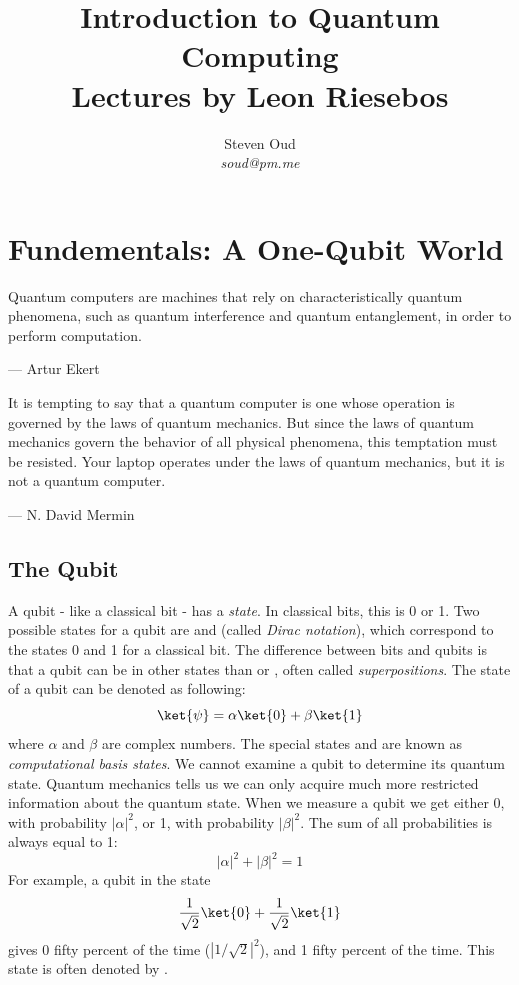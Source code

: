 \documentclass[11pt]{article}
\title{\textbf{Introduction to Quantum Computing \\
\large Lectures by Leon Riesebos}}
\author{Steven Oud \\ \emph{soud@pm.me}}
\begin{document}
\vfill
\maketitle

\tableofcontents

\newpage

\section{Fundementals: A One-Qubit World}
\epigraph{Quantum computers are machines that rely on characteristically quantum phenomena, such as quantum interference and quantum entanglement, in order to perform computation.}{--- Artur Ekert}

\epigraph{It is tempting to say that a quantum computer is one whose operation is governed by the laws of quantum mechanics. But since the laws of quantum mechanics govern the behavior of all physical phenomena, this temptation must be resisted. Your laptop operates under the laws of quantum mechanics, but it is not a quantum computer.}{--- N. David Mermin}

\subsection{The Qubit}
A qubit - like a classical bit - has a \emph{state}. In classical bits, this is 0 or 1. Two possible states for a qubit are  and  (called \emph{Dirac notation}), which correspond to the states 0 and 1 for a classical bit. The difference between bits and qubits is that a qubit can be in other states than  or , often called \emph{superpositions}. The state of a qubit can be denoted as following:
\[\ket{\psi} = \alpha\ket{0} + \beta\ket{1}\]
where $\alpha$ and $\beta$ are complex numbers. The special states  and  are known as \emph{computational basis states}. We cannot examine a qubit to determine its quantum state. Quantum mechanics tells us we can only acquire much more restricted information about the quantum state. When we measure a qubit we get either 0, with probability $|\alpha|^2$, or 1, with probability $|\beta|^2$. The sum of all probabilities is always equal to 1:
\[|\alpha|^2 + |\beta|^2 = 1\]
For example, a qubit in the state
\[
\dfrac{1}{\sqrt2}\ket{0}+\dfrac{1}{\sqrt2}\ket{1}
\]
gives 0 fifty percent of the time ($|1/\sqrt2|^2$), and 1 fifty percent of the time. This state is often denoted by \ket{+}.
\newpage
\end{document}
